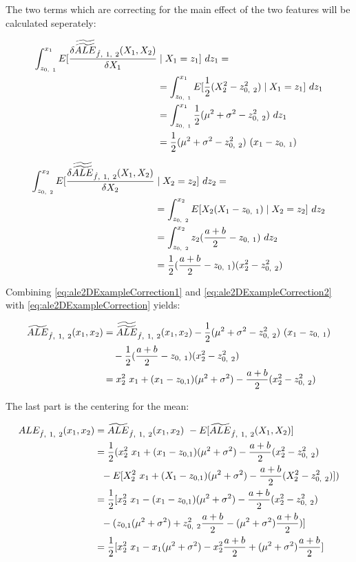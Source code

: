 \documentclass[]{krantz}
\begin{document}
The two terms which are correcting for the main effect of the two
features will be calculated seperately:

\begin{align}
\int_{z_{0,~1}}^{x_1}  E[\frac{\delta\widetilde{\widetilde{ALE}}_{\hat{f},~1,~2}(X_1, X_2)}{\delta X_1}
& \mid X_1 = z_1]~dz_1 = \notag \\
&= \int_{z_{0,~1}}^{x_1}  E[\frac{1}{2}(X_2^2 - z_{0, ~2}^2)\mid X_1 = z_1]~dz_1 \notag \\
&= \int_{z_{0,~1}}^{x_1}  \frac{1}{2}(\mu^2 + \sigma^2 - z_{0,~2}^2) ~dz_1 \notag \\
&= \frac{1}{2}(\mu^2 + \sigma^2 - z_{0,~2}^2)~(x_1 - z_{0,~1})
  \label{eq:ale2DExampleCorrection1}
\end{align}

\begin{align}
\int_{z_{0,~2}}^{x_2}  E[\frac{\delta\widetilde{\widetilde{ALE}}_{\hat{f},~1,~2}(X_1, X_2)}{\delta X_2} 
&\mid X_2 = z_2]~dz_2 = \notag \\
&= \int_{z_{0,~2}}^{x_2}  E[X_2 (X_1 - z_{0, ~1})\mid X_2 = z_2]~dz_2 \notag \\
&= \int_{z_{0,~2}}^{x_2}  z_2(\frac{a+b}{2} - z_{0, ~1}) ~dz_2 \notag \\
&= \frac{1}{2}(\frac{a+b}{2} - z_{0, ~1})(x_2^2 - z_{0, ~2}^2)
  \label{eq:ale2DExampleCorrection2}
\end{align}

Combining \eqref{eq:ale2DExampleCorrection1} and
\eqref{eq:ale2DExampleCorrection2} with \eqref{eq:ale2DExampleCorrection}
yields:

\begin{align} 
\widetilde{ALE}_{\hat{f},~1,~2}(x_1, x_2) 
&= \widetilde{\widetilde{ALE}}_{\hat{f},~1,~2}(x_1, x_2) - \frac{1}{2}(\mu^2 + \sigma^2 - z_{0,~2}^2)~(x_1 - z_{0,~1}) \notag \\
& ~~~ - \frac{1}{2}(\frac{a+b}{2} - z_{0, ~1})(x_2^2 - z_{0, ~2}^2) \notag \\
&= x_2^2~x_1 + (x_1 - z_{0,1})(\mu^2+\sigma^2) - \frac{a + b}{2}(x_2^2-z_{0,~2}^2)
\end{align}

The last part is the centering for the mean:

\begin{align} 
ALE_{\hat{f},~1,~2}(x_1, x_2) &= \widetilde{ALE}_{\hat{f},~1,~2}(x_1, x_2) ~ -  E[\widetilde{ALE}_{\hat{f},~1,~2}(X_1, X_2)] \notag \\
&= \frac{1}{2} (x_2^2~x_1 + (x_1 - z_{0,1})(\mu^2+\sigma^2) - \frac{a + b}{2}(x_2^2-z_{0,~2}^2) \notag \\
& ~~ - E[X_2^2~x_1 + (X_1 - z_{0,1})(\mu^2+\sigma^2) - \frac{a + b}{2}(X_2^2-z_{0,~2}^2)] ) \notag \\
&= \frac{1}{2} [x_2^2~x_1 - (x_1 - z_{0,1})(\mu^2+\sigma^2) - \frac{a + b}{2}(x_2^2-z_{0,~2}^2) \notag \\
& ~~ - (z_{0,1}(\mu^2+\sigma^2) + z_{0,~2}^2 \frac{a + b}{2} - (\mu^2+\sigma^2) \frac{a + b}{2}) ] \notag \\
&= \frac{1}{2} [x_2^2~x_1 - x_1(\mu^2+\sigma^2) - x_2^2 \frac{a + b}{2} + (\mu^2+\sigma^2) \frac{a + b}{2} ]
\end{align}
\end{document}
